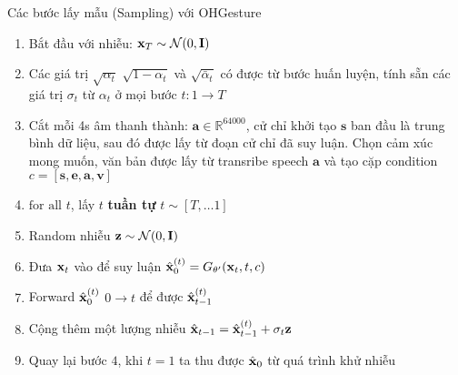 %	
%	
%	
%
%	



\begin{frame}{Các bước lấy mẫu (Sampling) với OHGesture}
	
	\begin{enumerate}
		\item Bắt đầu với nhiễu: $\mathbf{x}_T \sim \mathcal{N}(0, \mathbf{I})$
		\item Các giá trị $\sqrt{\alpha_t}$ $\sqrt{1 - \alpha_t}$ và $\sqrt{\bar{\alpha}_t}$ có được từ bước huấn luyện, tính sẵn các giá trị  $\sigma_t$ từ $\alpha_t$ ở mọi bước $t: 1 \rightarrow T$
		\item Cắt mỗi 4s âm thanh thành: $\mathbf{a} \in \mathbb{R}^{64000}$, cử chỉ khởi tạo $\mathbf{s}$ ban đầu là trung bình dữ liệu, sau đó được lấy từ đoạn cử chỉ đã suy luận. Chọn cảm xúc mong muốn, văn bản được lấy từ transribe speech $\mathbf{a}$ và tạo cặp condition $c = [\mathbf{s}, \mathbf{e}, \mathbf{a},  \mathbf{v}]$
		\item $\text{for all}$ $t$, lấy $t$ \textbf{tuần tự} $t \sim [T, \dots 1]$
		\item Random nhiễu $\mathbf{z} \sim \mathcal{N}(0, \mathbf{I})$
		\item Đưa $\mathbf{x}_t$ vào để suy luận $\hat{\mathbf{x}}_0^{(t)} = G_{\theta'}(\mathbf{x}_t, t, c)$
		\item Forward $\hat{\mathbf{x}}_0^{(t)}$ $0 \rightarrow t$ để được $\hat{\mathbf{x}}_{t-1}^{(t)}$
		\item Cộng thêm một lượng nhiễu $\hat{\mathbf{x}}_{t-1} = \hat{\mathbf{x}}_{t-1}^{(t)} + \sigma_t \mathbf{z}$
		\item Quay lại bước $4$, khi $t=1$ ta thu được $\hat{\mathbf{x}}_0$ từ quá trình khử nhiễu
	\end{enumerate}
\end{frame}

